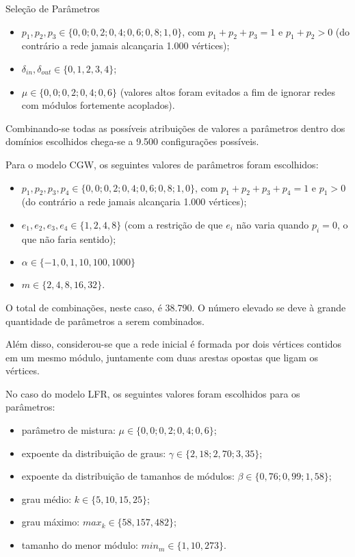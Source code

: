 \begin{section}{Seleção de Parâmetros}
\begin{itemize}
	\item $p_1, p_2, p_3 \in \{0,0; 0,2; 0,4; 0,6; 0,8; 1,0\}$, com $p_1 + p_2 + p_3 = 1$ e $p_1 + p_2 > 0$ (do contrário a rede jamais alcançaria 1.000 vértices);
	\item $\delta_{in}, \delta_{out} \in \{0, 1, 2, 3, 4\}$;
	\item $\mu \in \{0,0; 0,2; 0,4; 0,6\}$ (valores altos foram evitados a fim de ignorar redes com módulos fortemente acoplados).
\end{itemize}

Combinando-se todas as possíveis atribuições de valores a parâmetros dentro dos domínios escolhidos chega-se a 9.500 configurações possíveis.

Para o modelo CGW, os seguintes valores de parâmetros foram escolhidos:

\begin{itemize}
	\item $p_1, p_2, p_3, p_4 \in \{0,0; 0,2; 0,4; 0,6; 0,8; 1,0\}$, com $p_1 + p_2 + p_3 + p_4 = 1$ e $p_1 > 0$ (do contrário a rede jamais alcançaria 1.000 vértices);
	\item $e_1, e_2, e_3, e_4 \in \{1, 2, 4, 8\}$ (com a restrição de que $e_i$ não varia quando $p_i = 0$, o que não faria sentido);
	\item $\alpha \in \{-1, 0, 1, 10, 100, 1000\}$
	\item $m \in \{2, 4, 8, 16, 32\}$.
\end{itemize}

O total de combinações, neste caso, é 38.790. O número elevado se deve à grande quantidade de parâmetros a serem combinados.

Além disso, considerou-se que a rede inicial é formada por dois vértices contidos em um mesmo módulo, juntamente com duas arestas opostas que ligam os vértices.

No caso do modelo LFR, os seguintes valores foram escolhidos para os parâmetros:

\begin{itemize}
	\item parâmetro de mistura: $\mu \in \{0,0; 0,2; 0,4; 0,6\}$;
	\item expoente da distribuição de graus: $\gamma \in \{2,18; 2,70; 3,35\}$;
	\item expoente da distribuição de tamanhos de módulos: $\beta \in \{0,76; 0,99; 1,58\}$;
	\item grau médio: $k \in \{5, 10, 15, 25\}$;
	\item grau máximo: $max_k \in \{58, 157, 482\}$;
	\item tamanho do menor módulo: $min_m \in \{1, 10, 273\}$.
\end{itemize}


\end{section}
